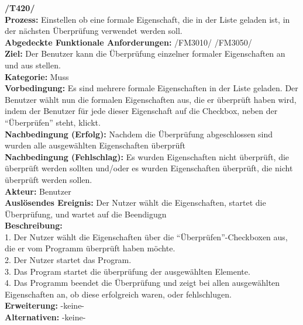 \documentclass[a4paper]{scrreprt}
\begin{document}
\textbf{/T420/}\\
\textbf{Prozess: }Einstellen ob eine formale Eigenschaft, die in der Liste geladen ist, in der nächsten Überprüfung verwendet werden soll. \\
\textbf{Abgedeckte Funktionale Anforderungen:} /FM3010/ /FM3050/ \\
\textbf{Ziel:} Der Benutzer kann die Überprüfung einzelner formaler
Eigenschaften an und aus stellen.\\
\textbf{Kategorie:} Muss\\
\textbf{Vorbedingung:} Es sind mehrere formale Eigenschaften in der Liste
geladen. Der Benutzer wählt nun die formalen Eigenschaften aus, die er überprüft
haben wird, indem der Benutzer für jede dieser Eigenschaft auf die Checkbox,
neben der "`Überprüfen"' steht, klickt.\\
\textbf{Nachbedingung (Erfolg):} Nachdem die Überprüfung abgeschlossen sind
wurden alle ausgewählten Eigenschaften überprüft\\
\textbf{Nachbedingung (Fehlschlag):} Es wurden Eigenschaften nicht überprüft,
die überprüft werden sollten und/oder es wurden Eigenschaften überprüft, die
nicht überprüft werden sollen.\\
\textbf{Akteur:} Benutzer\\
\textbf{Auslösendes Ereignis:} Der Nutzer wählt die Eigenschaften, startet die
Überprüfung, und wartet auf die Beendigugn	\\
\textbf{Beschreibung:} \\
1. Der Nutzer wählt die Eigenschaften über die "`Überprüfen"'-Checkboxen aus,
die er vom Programm überprüft haben möchte.\\
2. Der Nutzer startet das Program.\\
3. Das Program startet die überprüfung der ausgewählten Elemente.\\
4. Das Programm beendet die Überprüfung und zeigt bei allen ausgewählten
Eigenschaften an, ob diese erfolgreich waren, oder fehlschlugen.\\
\textbf {Erweiterung:}  -keine- \\
\textbf {Alternativen:} -keine- \\ \\
\end{document}
